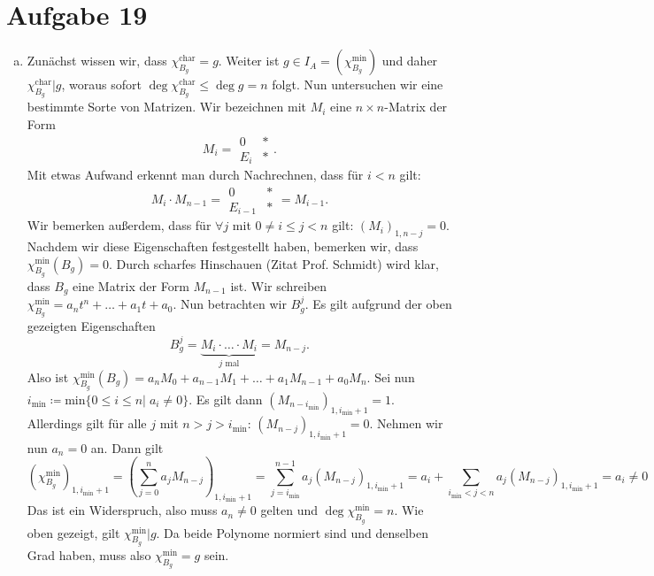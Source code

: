 \documentclass{article}
\theoremstyle{definition}
\begin{document}
\section*{Aufgabe 19}
\begin{enumerate}[(a)]
    \item Zunächst wissen wir, dass $\chi^\text{char}_{B_g} = g$. Weiter ist $g \in I_A = (\chi^\text{min}_{B_g})$ und daher $\chi^\text{char}_{B_g} | g$, woraus sofort $ \deg \chi^\text{char}_{B_g} \leq \deg g = n$ folgt. Nun untersuchen wir eine bestimmte Sorte von Matrizen. Wir bezeichnen mit $M_i$ eine $n\times n$-Matrix der Form 
    \[
        M_i = \begin{array}{c|c}
            0 & *\\\hline
            E_i & *
        \end{array}.
    \] Mit etwas Aufwand erkennt man durch Nachrechnen, dass für $i < n$ gilt:
    \[
        M_i \cdot M_{n-1} = \begin{array}{c|c}
            0 & *\\\hline
            E_{i-1} & *
        \end{array} = M_{i-1}.
    \] Wir bemerken außerdem, dass für $\forall j$ mit $0 \neq i \leq j < n$ gilt: $(M_i)_{1,n-j} = 0$. Nachdem wir diese Eigenschaften festgestellt haben, bemerken wir, dass $\chi^\text{min}_{B_g}(B_g) = 0$. Durch scharfes Hinschauen (Zitat Prof. Schmidt) wird klar, dass $B_g$ eine Matrix der Form $M_{n-1}$ ist. Wir schreiben $\chi^\text{min}_{B_g} = a_n t^n + \dots + a_1t + a_0$. Nun betrachten wir $B_g^j$. Es gilt aufgrund der oben gezeigten Eigenschaften
    \[
      B_g^j = \underbrace{M_i \cdot \dots \cdot M_i}_{j\text{ mal}} = M_{n-j}.
    \] Also ist $\chi^\text{min}_{B_g}(B_g) = a_nM_0 + a_{n-1}M_1 + \dots + a_1M_{n-1} + a_0M_n$. Sei nun $i_\text{min} \coloneqq \text{min} \{0\leq i\leq n |\; a_i \neq 0\}$. Es gilt dann $(M_{n-i_\text{min}})_{1,i_\text{min} +1} =1$.
    Allerdings gilt für alle $j$ mit $n > j > i_\text{min}$: $(M_{n-j})_{1,i_\text{min} + 1} = 0$. Nehmen wir nun $a_n = 0$ an. Dann gilt
    \[
      \left(\chi^\text{min}_{B_g}\right)_{1, i_\text{min} + 1} = \left(\sum_{j = 0}^{n}a_jM_{n-j}\right)_{1,i_\text{min} + 1} = \sum_{j = i_\text{min}}^{n-1}a_j\left(M_{n-j}\right)_{1,i_\text{min} + 1} = a_i + \sum_{i_\text{min} < j < n}a_j\left(M_{n-j}\right)_{1,i_\text{min} + 1} = a_i \neq 0
    \] Das ist ein Widerspruch, also muss $a_n \neq 0$ gelten und $\deg \chi^\text{min}_{B_g} = n$. Wie oben gezeigt, gilt $\chi^\text{min}_{B_g} | g$. Da beide Polynome normiert sind und denselben Grad haben, muss also $\chi^\text{min}_{B_g} = g$ sein.

\end{enumerate}
\end{document}
